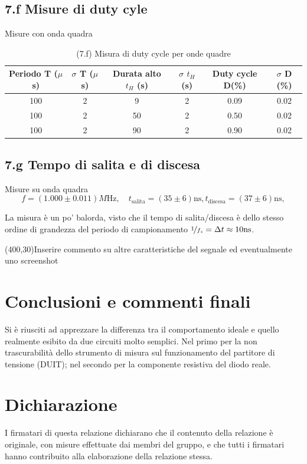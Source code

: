 \documentclass[10pt,a4paper]{article}
\begin{document}
\subsection*{7.f Misure di duty cyle}
Misure con onda quadra
\begin{table}[h]
\centering
\begin{tabular}{|c|c|c|c|c|c|}
\hline 
Periodo T ($\mu$ s)& $\sigma$ T ($\mu$ s) & Durata alto $t_H$ (s) & $\sigma$ $t_H$ (s)
& Duty cycle D(\%) & $\sigma$ D (\%) \\
\hline 
100 & 2 & 9 & 2 & 0.09 & 0.02 \\
100 & 2 & 50 & 2 & 0.50 & 0.02 \\
100 & 2 & 90 & 2 & 0.90 & 0.02 \\
\hline 
\end{tabular} 
\caption{(7.f) Misura di duty cycle per onde quadre }
\end{table}


\subsection*{7.g Tempo di salita e di discesa}
Misure su onda quadra
\[
f = (1.000 \pm 0.011) \si{M\Hz}, \quad
t_\mathrm{salita} = (35 \pm 6) \mathrm{ns},
t_\mathrm{discesa} = (37 \pm 6) \mathrm{ns},
\]

La misura è un po' balorda, visto che il tempo di salita/discesa è dello
stesso ordine di grandezza del periodo di campionamento $\nicefrac{1}{f_s} = \Delta t \approx 10 \si{\ns}$.


\framebox(400,30){Inserire commento su altre caratteristiche del segnale
ed eventualmente uno screenshot}

\section{Conclusioni e commenti finali}
Si è riusciti ad apprezzare la differenza tra il comportamento ideale e quello
realmente esibito da due circuiti molto semplici. Nel primo per la non
trascurabilità dello strumento di misura sul funzionamento del partitore di
tensione (DUIT); nel secondo per la componente resistiva del diodo reale.

\section*{Dichiarazione}
I firmatari di questa relazione dichiarano che il contenuto della relazione
\`e originale, con misure effettuate dai membri del gruppo, e che tutti i
firmatari hanno contribuito alla elaborazione della relazione stessa.
\end{document}
